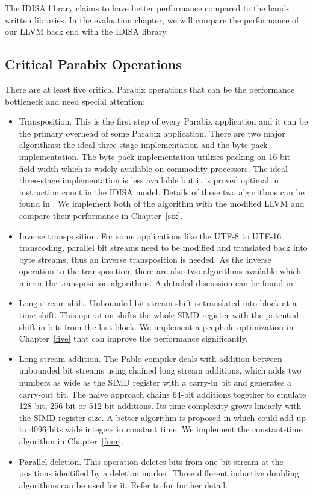 The IDISA library claims to have better performance compared to the hand-written libraries. In the evaluation chapter, we will compare the performance of our LLVM back end with the IDISA library.

\subsection{Critical Parabix Operations}
There are at least five critical Parabix operations that can be the performance bottleneck and need special attention:
\begin{itemize}
    \item Transposition. This is the first step of every Parabix application and it can be the primary overhead of some Parabix application. There are two major algorithms: the ideal three-stage implementation and the byte-pack implementation. The byte-pack implementation utilizes packing on 16 bit field width which is widely available on commodity processors. The ideal three-stage implementation is less available but it is proved optimal in instruction count in the IDISA model. Details of these two algorithms can be found in \cite{inductive_doubling_principle}. We implement both of the algorithm with the modified LLVM and compare their performance in Chapter~\ref{six}.

    \item Inverse transposition. For some applications like the UTF-8 to UTF-16 transcoding, parallel bit streams need to be modified and translated back into byte streams, thus an inverse transposition is needed. As the inverse operation to the transposition, there are also two algorithms available which mirror the transposition algorithms. A detailed discussion can be found in \cite{rob_u8u16}.

    \item Long stream shift. Unbounded bit stream shift is translated into block-at-a-time shift. This operation shifts the whole SIMD register with the potential shift-in bits from the last block. We implement a peephole optimization in Chapter~\ref{five} that can improve the performance significantly.

    \item Long stream addition. The Pablo compiler deals with addition between unbounded bit streams using chained long stream additions, which adds two numbers as wide as the SIMD register with a carry-in bit and generates a carry-out bit. The naive approach chains 64-bit additions together to emulate 128-bit, 256-bit or 512-bit additions. Its time complexity grows linearly with the SIMD register size. A better algorithm is proposed in \cite{rob_regex} which could add up to 4096 bits wide integers in constant time. We implement the constant-time algorithm in Chapter~\ref{four}.

    \item Parallel deletion. This operation deletes bits from one bit stream at the positions identified by a deletion marker. Three different inductive doubling algorithms can be used for it. Refer to \cite{rob_u8u16} for further detail.
\end{itemize}


